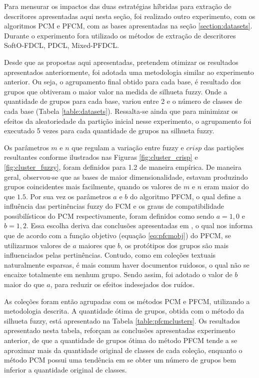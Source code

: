 Para mensurar os impactos das duas estratégias híbridas para extração de descritores apresentadas
aqui nesta seção, foi realizado outro experimento, com os algoritmos PCM e PFCM, com as bases
apresentadas na seção \ref{section:datasets}. Durante o experimento fora utilizado os métodos de
extração de descritores SoftO-FDCL, PDCL, Mixed-PFDCL. 

Desde que as propostas aqui apresentadas, pretendem otimizar os resultados apresentados
anteriormente, foi adotada uma metodologia similar ao experimento anterior. Ou seja, o agrupamento
final obtido para cada base, é resultado dos grupos que obtiveram o maior valor na medida de
silhueta fuzzy. Onde a quantidade de grupos para cada base, variou entre 2 e o número de classes
de cada base (Tabela \ref{table:datasets}). Ressalta-se ainda que para minimizar os efeitos da
aleatoriedade da partição inicial nesse experimento, o agrupamento foi executado 5 vezes para cada
quantidade de grupos na silhueta fuzzy. 

Os parâmetros $m$ e $n$ que regulam a variação entre fuzzy e $crisp$ das partições resultantes
conforme ilustrados nas Figuras \ref{fig:cluster_crisp} e \ref{fig:cluster_fuzzy}, foram definidos
para 1.2 de maneira empírica. De maneira geral, observou-se que as bases de maior dimensionalidade,
estavam produzindo grupos coincidentes mais facilmente, quando os valores de $m$ e $n$ eram maior do
que $1.5$. Por sua vez os parâmetros $a$ e $b$ do algoritmo PFCM, o qual define a influência das
pertinências fuzzy do FCM e os graus de compatibilidade possibilísticos do PCM respectivamente,
foram definidos como sendo $a = 1,0$ e $b = 1,2$. Essa escolha deriva das conclusões apresentadas
em , o qual nos informa que de acordo com a função objetivo (equação
\ref{eq:pfcmobj}) do PFCM, se utilizarmos valores de $a$ maiores que $b$, os protótipos dos grupos
são mais influenciados pelas pertinências. Contudo, como em coleções textuais 
naturalmente esparsas, é mais comum haver documentos ruidosos, o qual não se encaixe totalmente em
nenhum grupo. Sendo assim, foi adotado o valor de $b$ maior do que $a$, para reduzir os efeitos
indesejados dos ruídos.

As coleções foram então agrupadas com os métodos PCM e PFCM, utilizando a metodologia descrita. A
quantidade ótima de grupos, obtida com o método da silhueta fuzzy, está apresentado na Tabela
\ref{table:pfcmclusters}. Os resultados apresentado nesta tabela, reforçam as conclusões
apresentadas experimento anterior, de que a quantidade de grupos ótima do método PFCM tende a se
aproximar mais da quantidade original de classes de cada coleção, enquanto o método PCM possui uma
tendência em se obter um número de grupos bem inferior a quantidade original de classes.

